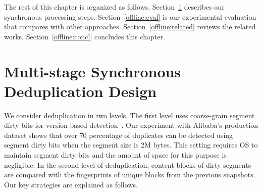 The rest of this chapter is organized as follows.
Section~\ref{offline:design} describes our synchronous processing steps.
Section~\ref{offline:eval} is our experimental evaluation that compares with other approaches.
Section~\ref{offline:related} reviews the related works.
Section~\ref{offline:concl} concludes this chapter.

\section{Multi-stage Synchronous Deduplication Design}
\label{offline:design}
We consider deduplication in two levels. The first level
uses coarse-grain segment  dirty bits for version-based detection~\cite{Clements2009,Vrable2009}.
Our experiment with Alibaba's production dataset shows that over 70 percentage of
duplicates can be detected using segment dirty bits when the segment size is 2M bytes.
This setting requires OS to maintain segment dirty bits and
the amount of space for this purpose is negligible. In the second level of deduplication, content blocks of dirty segments
are compared with the fingerprints of unique  blocks from the previous snapshots.
Our key strategies are explained as follows.
